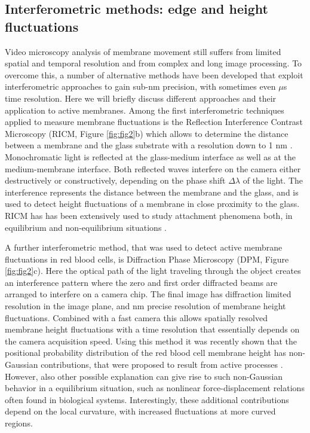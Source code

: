 \documentclass[graybox]{svmult}
\begin{document}
	\subsection{Interferometric methods: edge and height fluctuations}
Video microscopy analysis of membrane movement still suffers from limited spatial and temporal resolution and from complex and long image processing. To overcome this, a number of alternative methods have been developed that exploit interferometric approaches to gain sub-nm precision, with sometimes even $\mu$s time resolution. Here we will briefly discuss different approaches and their application to active membranes. Among the first interferometric techniques applied to measure membrane fluctuations is the Reflection Interference Contrast Microscopy (RICM, Figure \ref{fig:fig2}b) which allows to determine the distance between a membrane and the glass substrate with a resolution down to 1 nm \cite{Radler:1993}. Monochromatic light is reflected at the glass-medium interface as well as at the medium-membrane interface. Both reflected waves interfere on the camera either destructively or constructively, depending on the phase shift $\Delta \lambda$ of the light. The interference represents the distance between the membrane and the glass, and is used to detect height fluctuations of a membrane in close proximity to the glass. RICM has has been extensively used to study attachment phenomena both, in equilibrium and non-equilibrium situations \cite{Schmidt_2014, Monzel_2016}. 

A further interferometric method, that was used to detect active membrane fluctuations in red blood cells, is Diffraction Phase Microscopy (DPM, Figure \ref{fig:fig2}c). Here the optical path of the light traveling through the object creates an interference pattern where the zero and first order diffracted beams are arranged to interfere on a camera chip. The final image has diffraction limited resolution in the image plane, and nm precise resolution of membrane height fluctuations. Combined with a fast camera this allows spatially resolved membrane height fluctuations with a time resolution that essentially depends on the camera acquisition speed. Using this method it was recently shown that the positional probability distribution of the red blood cell membrane height has non-Gaussian contributions, that were proposed to result from active processes \cite{Park:2010}. However, also other possible explanation can give rise to such non-Gaussian behavior in a equilibrium situation, such as nonlinear force-displacement relations often found in biological systems. Interestingly, these additional contributions depend on the local curvature, with increased fluctuations at more curved regions. 
\end{document}

